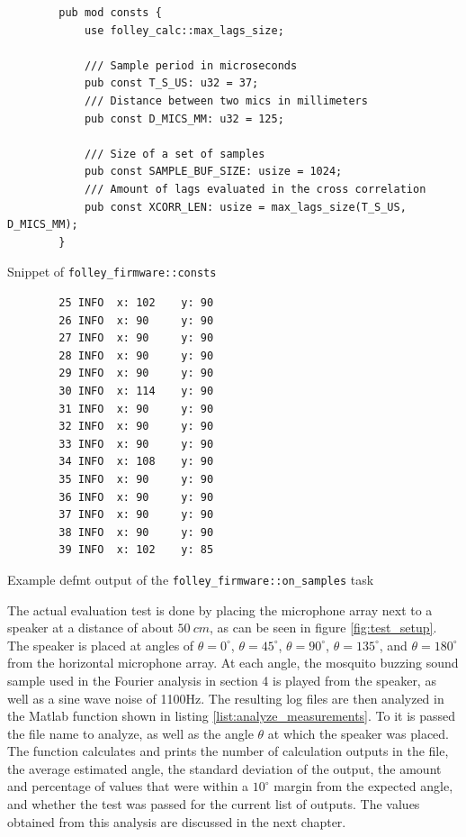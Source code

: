 \documentclass[a4paper]{article}
\newcommand{\rust}[1]{\texttt{#1}}
\begin{document}
\begin{listing}[H]
    \begin{verbatim}
        pub mod consts {
            use folley_calc::max_lags_size;

            /// Sample period in microseconds
            pub const T_S_US: u32 = 37;
            /// Distance between two mics in millimeters
            pub const D_MICS_MM: u32 = 125;

            /// Size of a set of samples
            pub const SAMPLE_BUF_SIZE: usize = 1024;
            /// Amount of lags evaluated in the cross correlation
            pub const XCORR_LEN: usize = max_lags_size(T_S_US, D_MICS_MM);
        }
    \end{verbatim}
    \caption{Snippet of \rust{folley_firmware::consts}}
    \label{list:consts}
\end{listing}

\begin{listing}[H]
    \begin{verbatim}
        25 INFO  x: 102    y: 90
        26 INFO  x: 90     y: 90
        27 INFO  x: 90     y: 90
        28 INFO  x: 90     y: 90
        29 INFO  x: 90     y: 90
        30 INFO  x: 114    y: 90
        31 INFO  x: 90     y: 90
        32 INFO  x: 90     y: 90
        33 INFO  x: 90     y: 90
        34 INFO  x: 108    y: 90
        35 INFO  x: 90     y: 90
        36 INFO  x: 90     y: 90
        37 INFO  x: 90     y: 90
        38 INFO  x: 90     y: 90
        39 INFO  x: 102    y: 85
    \end{verbatim}
    \caption{Example defmt output of the \rust{folley_firmware::on_samples} task}
    \label{list:defmt_output}
\end{listing}

The actual evaluation test is done by placing the microphone array next to a speaker at a distance of about $50\ cm$, as can be seen in figure \ref{fig:test_setup}. The speaker is placed at angles of $\theta = 0^{\circ}$, $\theta = 45^{\circ}$, $\theta = 90^{\circ}$, $\theta = 135^{\circ}$, and $\theta = 180^{\circ}$ from the horizontal microphone array. At each angle, the mosquito buzzing sound sample used in the Fourier analysis in section 4 is played from the speaker, as well as a sine wave noise of 1100Hz. The resulting log files are then analyzed in the Matlab function shown in listing \ref{list:analyze_measurements}. To it is passed the file name to analyze, as well as the angle $\theta$ at which the speaker was placed. The function calculates and prints the number of calculation outputs in the file, the average estimated angle, the standard deviation of the output, the amount and percentage of values that were within a $10^{\circ}$ margin from the expected angle, and whether the test was passed for the current list of outputs. The values obtained from this analysis are discussed in the next chapter.
\end{document}
